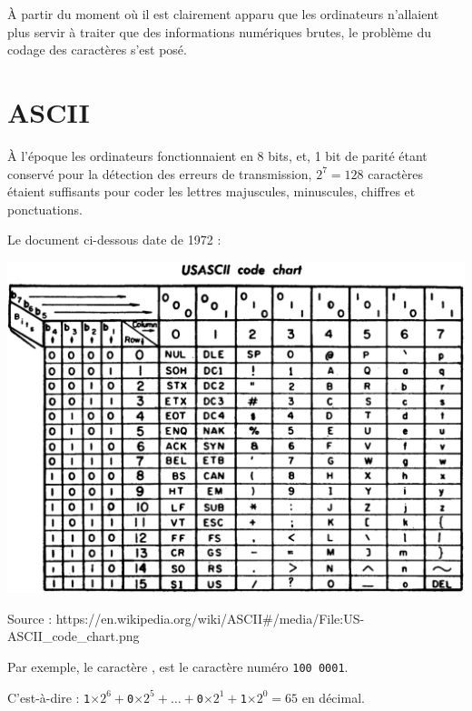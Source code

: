 {\date{1940} À partir du moment où il est clairement apparu que les ordinateurs n'allaient plus servir à traiter que des informations numériques brutes, le problème du codage des caractères s'est posé.

\section{ASCII}
	 
 

À l'époque les ordinateurs fonctionnaient en 8 bits, et, 1 bit de parité étant conservé pour la détection des erreurs de transmission, $2^7=128$ caractères étaient suffisants pour coder les lettres majuscules, minuscules, chiffres et ponctuations.

\medskip

Le document ci-dessous date de 1972 :

\begin{center}\includegraphics[scale=0.12]{images/US-ASCII_code_chart}

\footnotesize Source : https://en.wikipedia.org/wiki/ASCII\#/media/File:US-ASCII\_code\_chart.png
\end{center}

Par exemple, le caractère , est le caractère numéro \texttt{100 0001}.

C'est-à-dire : \texttt{1}$\times2^6+$\texttt{0}$\times2^5+\ldots+$\texttt{0}$\times2^1+$\texttt{1}$\times2^0=65$ en décimal. 

}
